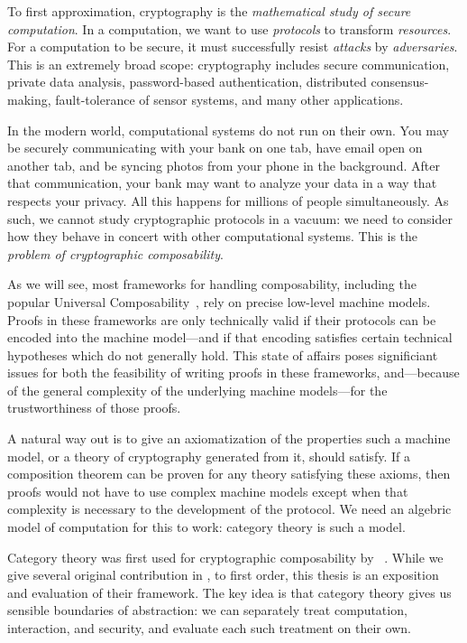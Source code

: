 To first approximation, cryptography is the \emph{mathematical study of secure
computation}. In a computation, we want to use \emph{protocols} to transform
\emph{resources}. For a computation to be secure, it must successfully resist
\emph{attacks} by \emph{adversaries}. This is an extremely broad scope:
cryptography includes secure communication, private data analysis,
password-based authentication, distributed consensus-making, fault-tolerance of
sensor systems, and many other applications.

In the modern world, computational systems do not run on their own. You may be
securely communicating with your bank on one tab, have email open on another
tab, and be syncing photos from your phone in the background. After that
communication, your bank may want to analyze your data in a way that respects
your privacy. All this happens for millions of people simultaneously. As such,
we cannot study cryptographic protocols in a vacuum: we need to consider how
they behave in concert with other computational systems. This is the
\emph{problem of cryptographic composability}.

As we will see, most frameworks for handling composability, including the
popular Universal Composability~\cite{canetti-2000}, rely on precise low-level
machine models. Proofs in these frameworks are only technically valid if their
protocols can be encoded into the machine model---and if that encoding satisfies
certain technical hypotheses which do not generally hold. This state of affairs
poses significiant issues for both the feasibility of writing proofs in these
frameworks, and---because of the general complexity of the underlying
machine models---for the trustworthiness of those proofs.

A natural way out is to give an axiomatization of the properties such a machine
model, or a theory of cryptography generated from it, should satisfy. If a
composition theorem can be proven for any theory satisfying these axioms, then
proofs would not have to use complex machine models except when that complexity
is necessary to the development of the protocol. We need an algebric model of
computation for this to work: category theory is such a model.

Category theory was first used for cryptographic composability by
\citeauthor{broadbent-karvonen-2022}~\cite{broadbent-karvonen-2022}. While we
give several original contribution in
,
to first order, this thesis is an exposition and evaluation of their framework.
The key idea is that category theory gives us sensible boundaries of
abstraction: we can separately treat computation, interaction, and security, and
evaluate each such treatment on their own.

